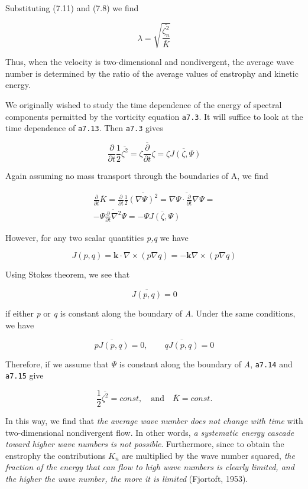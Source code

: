 Substituting (7.11) and (7.8) we find

\[\lambda = \sqrt{ \frac{\overline{\zeta_n^2} }{\overline{K}}  }\]

Thus, when the velocity is two-dimensional and nondivergent, the
average wave number is determined by the ratio of the average values of
enstrophy and kinetic energy.

We originally wished to study the time dependence of the energy of
spectral components permitted by the vorticity equation \texttt{a7.3}.
It will suffice to look at the time dependence of \texttt{a7.13}. Then
\texttt{a7.3} gives

\[\frac{\partial}{\partial t} \frac{1}{2} \overline{\zeta^2} =
\overline{\zeta \frac{\partial}{\partial t} \zeta } =
\overline{\zeta J(\zeta,\Psi)}\]

Again assuming no mass transport through the boundaries of A, we find

\[\begin{aligned}
\frac{\partial}{\partial t} \overline{K} =
\frac{\partial}{\partial t} \frac{1}{2} \overline{(\nabla\Psi)^2} =
\overline{\nabla\Psi \cdot \frac{\partial}{\partial t}\nabla\Psi} =\\
-\overline{\Psi\frac{\partial}{\partial t} \nabla^2\Psi} =
-\overline{\Psi J(\zeta,\Psi)}
\end{aligned}\]

However, for any two scalar quantities \emph{p,q} we have

\[J(p,q) = \textbf{k}\cdot\nabla \times \left( p\nabla q \right) = - \textbf{k}\nabla \times \left( p\nabla q \right)\]

Using Stokes\textquotesingle{} theorem, we see that

\[\overline{J\left( p,q \right)} = 0\]

if either \emph{p} or \emph{q} is constant along the boundary of
\emph{A}. Under the same conditions, we have

\[\overline{p J\left( p,q \right)} = 0, \qquad \overline{q J\left( p,q \right)} = 0\]

Therefore, if we assume that \(\Psi\) is constant along the boundary of
\emph{A}, \texttt{a7.14} and \texttt{a7.15} give

\[\frac{1}{2}\overline{\zeta^{2}} =  const, \quad \text{and} \quad \overline{K} = const.\]

In this way, we find that \emph{the average wave number does not change
with time} with two-dimensional nondivergent flow. In other words,
\emph{a systematic energy cascade toward higher wave numbers is not
possible}. Furthermore, since to obtain the enstrophy the contributions
\(K_{n}\) are multiplied by the wave number squared, \emph{the fraction
of the energy that can flow to high wave numbers is clearly limited, and
the higher the wave number, the more it is limited} (Fjortoft, 1953).

